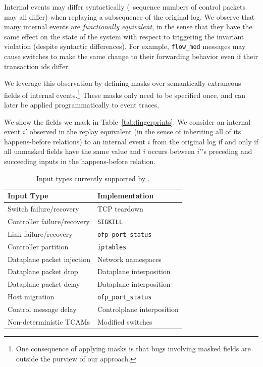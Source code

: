  Internal events may differ syntactically (\eg~sequence numbers
of control packets may all differ) when replaying a subsequence of the original log.
We observe that many internal events are {\em functionally
equivalent}, in the sense that they
have the same effect on the state of the system with respect to triggering the
invariant violation (despite syntactic differences). For example,
\verb=flow_mod=
messages may cause switches to make the same change to their forwarding behavior
even if their transaction ids differ.

We leverage this observation by defining
masks over semantically extraneous fields of
internal events.\footnote{One consequence
of applying masks is that bugs involving masked fields are outside the purview of
our approach.} These masks only need to be specified once, and can later be
applied programmatically to event traces.

We show the fields we mask in Table~\ref{tab:fingerprints}. We consider an
internal event $i'$ observed in the replay
equivalent (in the sense of inheriting all of its happens-before relations) to an internal
event $i$ from the original log if and only if all unmasked fields have the same value
and $i$ occurs between $i'$'s preceding and succeeding inputs in the
happens-before relation.

\begin{table}[tb]
\centering
\footnotesize
\begin{tabular}{|l|l|}
\hline
\textbf{Input Type} & \textbf{Implementation} \\
\hline
\hline
Switch failure/recovery & TCP teardown \\
\hline
Controller failure/recovery & \verb=SIGKILL= \\
\hline
Link failure/recovery & \verb=ofp_port_status= \\
\hline
Controller partition & \verb=iptables= \\
\hline
Dataplane packet injection & Network namespaces \\
\hline
Dataplane packet drop & Dataplane interposition \\
\hline
Dataplane packet delay & Dataplane interposition \\
\hline
Host migration & \verb=ofp_port_status= \\
\hline
Control message delay & Controlplane interposition \\
\hline
Non-deterministic TCAMs & Modified switches \\
\hline
\end{tabular}
\caption{Input types currently supported by \projectname.}
\label{tab:inputs}
\vspace{-0.2cm}
\end{table}

